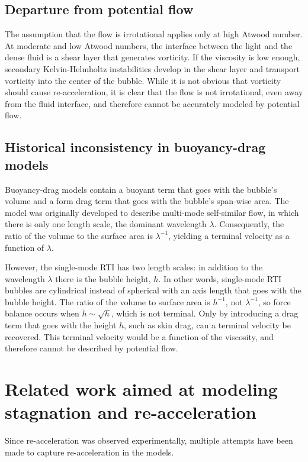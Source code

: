 \subsection{Departure from potential flow}
The assumption that the flow is irrotational applies only at high Atwood number.
At moderate and low Atwood numbers, the interface between the light and the dense fluid is a shear layer that generates vorticity.
If the viscosity is low enough, secondary Kelvin-Helmholtz instabilities develop in the shear layer and transport vorticity into the center of the bubble.
While it is not obvious that vorticity should cause re-acceleration, it is clear that the flow is not irrotational, even away from the fluid interface, and therefore cannot be accurately modeled by potential flow.

\subsection{Historical inconsistency in buoyancy-drag models}

Buoyancy-drag models contain a buoyant term that goes with the bubble's volume and a form drag term that goes with the bubble's span-wise area.
The model was originally developed to describe multi-mode self-similar flow, in which there is only one length scale, the dominant wavelength $\lambda$.
Consequently, the ratio of the volume to the surface area is $\lambda^{-1}$, yielding a terminal velocity as a function of $\lambda$.

However, the single-mode RTI has two length scales: in addition to the wavelength $\lambda$ there is the bubble height, $h$.
In other words, single-mode RTI bubbles are cylindrical instead of spherical with an axis length that goes with the bubble height.
The ratio of the volume to surface area is $h^{-1}$, not $\lambda^{-1}$, so force balance occurs when $\dot{h} \sim \sqrt{h}$, which is not terminal.
Only by introducing a drag term that goes with the height $h$, such as skin drag, can a terminal velocity be recovered.
This terminal velocity would be a function of the viscosity, and therefore cannot be described by potential flow.

\section{Related work aimed at modeling stagnation and re-acceleration}
Since re-acceleration was observed experimentally, multiple attempts have been made to capture re-acceleration in the models.

